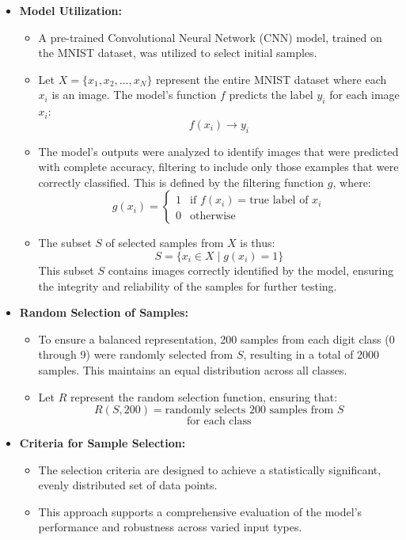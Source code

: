 \documentclass[10pt, conference, a4paper, final]{IEEEtran}
\begin{document}
\begin{itemize}
    \item \textbf{Model Utilization:}
        \begin{itemize}
            \item A pre-trained Convolutional Neural Network (CNN) model, trained on the MNIST dataset, was utilized to select initial samples.
            \item Let \( X = \{x_1, x_2, \dots, x_N\} \) represent the entire MNIST dataset where each \( x_i \) is an image. The model's function \( f \) predicts the label \( y_i \) for each image \( x_i \):
            \[ f(x_i) \rightarrow y_i \]
            \item The model's outputs were analyzed to identify images that were predicted with complete accuracy, filtering to include only those examples that were correctly classified. This is defined by the filtering function \( g \), where:
            \[ g(x_i) = 
            \begin{cases} 
            1 & \text{if } f(x_i) = \text{true label of } x_i \\
            0 & \text{otherwise}
            \end{cases} \]
            \item The subset \( S \) of selected samples from \( X \) is thus:
            \[ S = \{x_i \in X \mid g(x_i) = 1\} \]
            This subset \( S \) contains images correctly identified by the model, ensuring the integrity and reliability of the samples for further testing.
        \end{itemize}
    \item \textbf{Random Selection of Samples:}
        \begin{itemize}
            \item To ensure a balanced representation, 200 samples from each digit class (0 through 9) were randomly selected from \( S \), resulting in a total of 2000 samples. This maintains an equal distribution across all classes.
            \item Let \( R \) represent the random selection function, ensuring that:
            \[ R(S, 200) = \text{randomly selects 200 samples from } S \]
            \[ \text{for each class} \]
        \end{itemize}
    \item \textbf{Criteria for Sample Selection:}
        \begin{itemize}
            \item The selection criteria are designed to achieve a statistically significant, evenly distributed set of data points.
            \item This approach supports a comprehensive evaluation of the model’s performance and robustness across varied input types.
        \end{itemize}
\end{itemize}
\end{document}
